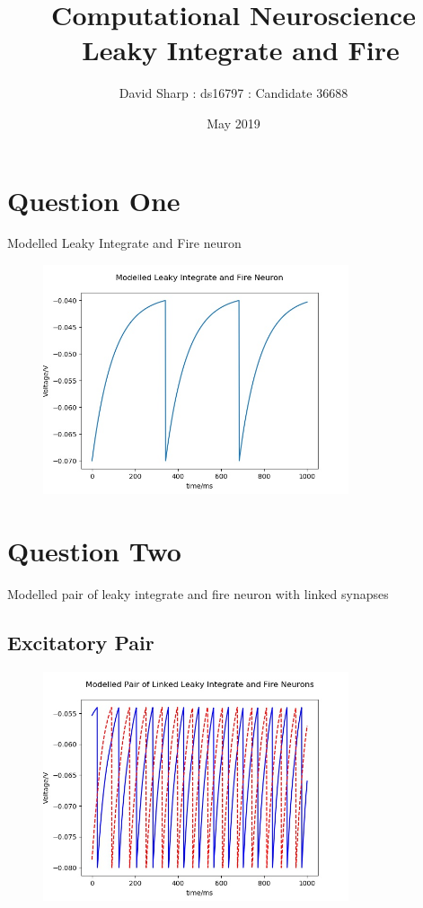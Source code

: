 \documentclass[10pt]{article}
\title{Computational Neuroscience \\\ Leaky Integrate and Fire}
\author{David Sharp : ds16797 : Candidate 36688}
\date{May 2019}
\begin{document}
    \maketitle
    \section{Question One}
    Modelled Leaky Integrate and Fire neuron
    \begin{figure}[H]
        \includegraphics[width=9cm ]{linf.jpg}
        \label{fig:linfGraph}
    \end{figure}


    \section{Question Two}
    Modelled pair of leaky integrate and fire neuron with linked synapses
    \subsection{Excitatory Pair}
    \begin{figure}[H]
        \includegraphics[width=9cm ]{pairEx.jpg}
        \label{fig:pairExGraph}
    \end{figure}
\end{document}
